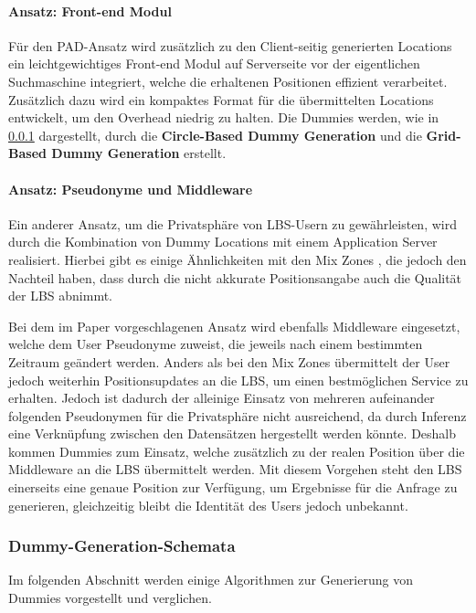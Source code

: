 \paragraph{Ansatz: Front-end Modul \cite{Lu2008}} \label{para:modul}
Für den PAD-Ansatz wird zusätzlich zu den Client-seitig generierten Locations ein leichtgewichtiges Front-end Modul auf Serverseite vor der eigentlichen Suchmaschine integriert, welche die erhaltenen Positionen effizient verarbeitet. Zusätzlich dazu wird ein kompaktes Format für die übermittelten Locations entwickelt, um den Overhead niedrig zu halten. Die Dummies werden, wie in \ref{subsubsection:dgschema} dargestellt, durch die \textbf{Circle-Based Dummy Generation} und die \textbf{Grid-Based Dummy Generation} erstellt.

\paragraph{Ansatz: Pseudonyme und Middleware \cite{Sahu2012}} \label{para:middle}
Ein anderer Ansatz, um die Privatsphäre von LBS-Usern zu gewährleisten, wird durch die Kombination von Dummy Locations mit einem Application Server realisiert. Hierbei gibt es einige Ähnlichkeiten mit den Mix Zones \cite{Beresford2003}, die jedoch den Nachteil haben, dass durch die nicht akkurate Positionsangabe auch die Qualität der LBS abnimmt. 

Bei dem im Paper vorgeschlagenen Ansatz wird ebenfalls Middleware eingesetzt, welche dem User Pseudonyme zuweist, die jeweils nach einem bestimmten Zeitraum geändert werden. Anders als bei den Mix Zones übermittelt der User jedoch weiterhin Positionsupdates an die LBS, um einen bestmöglichen Service zu erhalten. Jedoch ist dadurch der alleinige Einsatz von mehreren aufeinander folgenden Pseudonymen für die Privatsphäre nicht ausreichend, da durch Inferenz eine Verknüpfung zwischen den Datensätzen hergestellt werden könnte. Deshalb kommen Dummies zum Einsatz, welche zusätzlich zu der realen Position über die Middleware an die LBS übermittelt werden. Mit diesem Vorgehen steht den LBS einerseits eine genaue Position zur Verfügung, um Ergebnisse für die Anfrage zu generieren, gleichzeitig bleibt die Identität des Users jedoch unbekannt.

\subsubsection{Dummy-Generation-Schemata} \label{subsubsection:dgschema}
Im folgenden Abschnitt werden einige Algorithmen zur Generierung von Dummies vorgestellt und verglichen.

